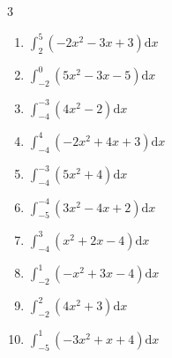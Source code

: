 \begin{multicols}{3}
\begin{enumerate}
\resetques

  \item $\displaystyle \int_{2}^{5}\left( -2x^{2}-3x+3 \right) \mathrm{d}x$

        \phantom{$\displaystyle =-108$}

  \item $\displaystyle \int_{-2}^{0}\left( 5x^{2}-3x-5 \right) \mathrm{d}x$


  \item $\displaystyle \int_{-4}^{-3}\left( 4x^{2}-2 \right) \mathrm{d}x$

        \phantom{$\displaystyle =49$}

  \item $\displaystyle \int_{-4}^{4}\left( -2x^{2}+4x+3 \right) \mathrm{d}x$


  \item $\displaystyle \int_{-4}^{-3}\left( 5x^{2}+4 \right) \mathrm{d}x$


\columnbreak %

  \item $\displaystyle \int_{-5}^{-4}\left( 3x^{2}-4x+2 \right) \mathrm{d}x$


  \item $\displaystyle \int_{-4}^{3}\left( x^{2}+2x-4 \right) \mathrm{d}x$


  \item $\displaystyle \int_{-2}^{1}\left( -x^{2}+3x-4 \right) \mathrm{d}x$


  \item $\displaystyle \int_{-2}^{2}\left( 4x^{2}+3 \right) \mathrm{d}x$


  \item $\displaystyle \int_{-5}^{1}\left( -3x^{2}+x+4 \right) \mathrm{d}x$

        \phantom{$\displaystyle =-134$}

\columnbreak %


\end{enumerate}
\end{multicols}
